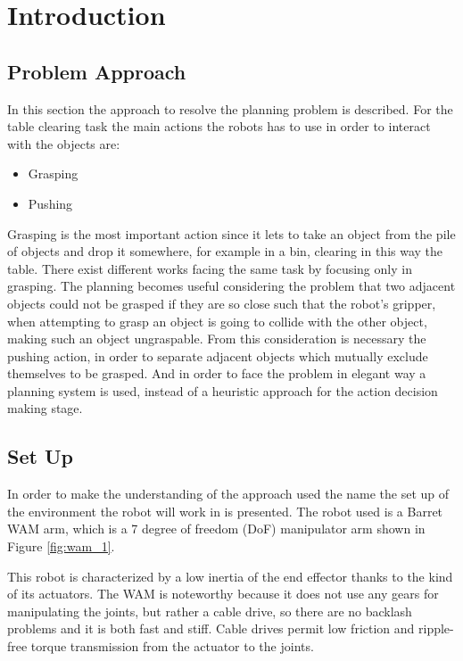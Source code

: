 \chapter{Introduction}
\label{ch:introduction}

\section{Problem Approach}
In this section the approach to resolve the planning problem is described. For the table clearing task the main actions the robots has to use in order to interact with the objects are:
\begin{itemize}
\item Grasping
\item Pushing
\end{itemize}
Grasping is the most important action since it lets to take an object from the pile of objects and drop it somewhere, for example in a bin, clearing in this way the table. There exist different works facing the same task by focusing only in grasping. The planning becomes useful considering the problem that two adjacent objects could not be grasped if they are so close such that the robot's gripper, when attempting to grasp an object is going to collide with the other object, making such an object ungraspable. From this consideration is necessary the pushing action, in order to separate adjacent objects which mutually exclude themselves to be grasped.  And in order to face the problem in elegant way a planning system is used, instead of a heuristic approach for the action decision making stage.

\section{Set Up}
In order to make the understanding of the approach used the name the set up of the environment the robot will work in is presented. 
The robot used is a Barret WAM arm, which is a 7 degree of freedom (DoF) manipulator arm shown in Figure \ref{fig:wam_1}. 

This robot is characterized by a low inertia of the end effector thanks to the kind of its actuators. The WAM is noteworthy because it does not use any gears for manipulating the joints, but rather a cable drive, so there are no backlash problems and it is both fast and stiff. Cable drives permit low friction and ripple-free torque transmission from the actuator to the joints. 

